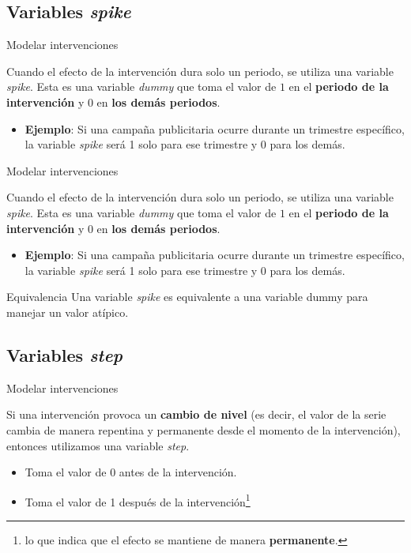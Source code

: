 \documentclass[11pt]{beamer}
\begin{document}
\subsection{Variables \textit{spike}}
\begin{frame}{Modelar intervenciones}
	\begin{block}{}
		Cuando el efecto de la intervención dura solo un periodo, se utiliza una variable \textit{spike}. Esta es una variable \textit{dummy} que toma el valor de $1$ en el \textbf{periodo de la intervención} y $0$ en \textbf{los demás periodos}.
		\begin{itemize}
			\item \textbf{Ejemplo}: Si una campaña publicitaria ocurre durante un trimestre específico, la variable \textit{spike} será 1 solo para ese trimestre y 0 para los demás.
		\end{itemize}
	\end{block}
\end{frame}

\begin{frame}{Modelar intervenciones}
	\begin{block}{}
		Cuando el efecto de la intervención dura solo un periodo, se utiliza una variable \textit{spike}. Esta es una variable \textit{dummy} que toma el valor de $1$ en el \textbf{periodo de la intervención} y $0$ en \textbf{los demás periodos}.
		\begin{itemize}
			\item \textbf{Ejemplo}: Si una campaña publicitaria ocurre durante un trimestre específico, la variable \textit{spike} será 1 solo para ese trimestre y 0 para los demás.
		\end{itemize}
	\end{block}
	\begin{block}{Equivalencia}
		Una variable \textit{spike} es equivalente a una variable dummy para manejar un valor atípico.
	\end{block}
\end{frame}

\subsection{Variables \textit{step}}
\begin{frame}{Modelar intervenciones}
	\begin{block}{}
		Si una intervención provoca un \textbf{cambio de nivel} (es decir, el valor de la serie cambia de manera repentina y permanente desde el momento de la intervención), entonces utilizamos una variable \textit{step}.
		\begin{itemize}
			\item Toma el valor de 0 antes de la intervención.
			\item Toma el valor de 1 después de la intervención\footnote{lo que indica que el efecto se mantiene de manera \textbf{permanente}.} 
		\end{itemize}
	\end{block}
\end{frame}
\end{document}
